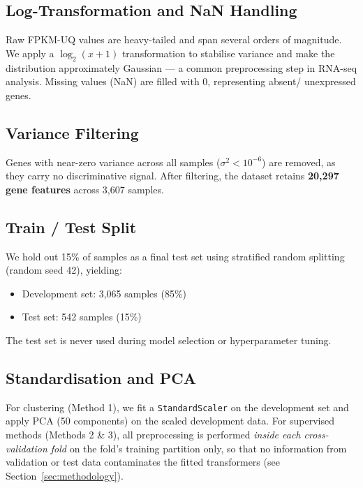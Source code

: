 \documentclass[11pt,letterpaper]{article}
\begin{document}
\subsection{Log-Transformation and NaN Handling}

Raw FPKM-UQ values are heavy-tailed and span several orders of magnitude.
We apply a $\log_2(x + 1)$ transformation to stabilise variance and make the
distribution approximately Gaussian --- a common preprocessing step in RNA-seq
analysis.  Missing values (NaN) are filled with 0, representing absent/
unexpressed genes.

\subsection{Variance Filtering}

Genes with near-zero variance across all samples ($\sigma^2 < 10^{-6}$) are
removed, as they carry no discriminative signal.  After filtering, the dataset
retains \textbf{20,297 gene features} across 3,607 samples.

\subsection{Train / Test Split}

We hold out 15\% of samples as a final test set using stratified random
splitting (random seed 42), yielding:
\begin{itemize}[leftmargin=2em,itemsep=0pt]
  \item Development set: 3,065 samples (85\%)
  \item Test set: 542 samples (15\%)
\end{itemize}
The test set is never used during model selection or hyperparameter tuning.

\subsection{Standardisation and PCA}

For clustering (Method 1), we fit a \texttt{StandardScaler} on the development
set and apply PCA (50 components) on the scaled development data.  For
supervised methods (Methods 2 \& 3), all preprocessing is performed \emph{inside
each cross-validation fold} on the fold's training partition only, so that no
information from validation or test data contaminates the fitted transformers
(see Section~\ref{sec:methodology}).

\end{document}
